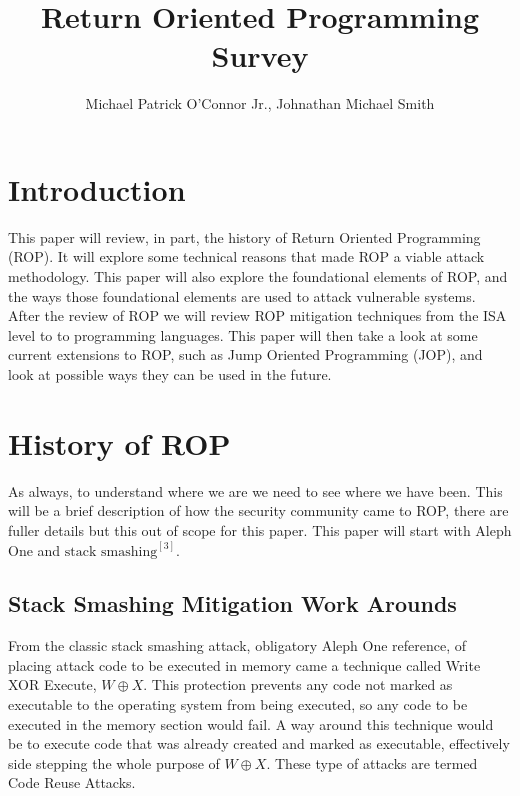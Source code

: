 \documentclass[11pt]{amsart}
\title{Return Oriented Programming Survey}
\author{Michael Patrick O'Connor Jr., Johnathan Michael Smith}
\date{}
\begin{document}
\maketitle

\newpage
\section*{Introduction}
This paper will review, in part, the history of Return Oriented Programming (ROP). It will explore some technical reasons that made ROP a viable attack methodology. This paper will also explore the foundational elements of ROP, and the ways those foundational elements are used to attack vulnerable systems. After the review of ROP we will review ROP mitigation techniques from the ISA level to to programming languages. This paper will then take a look at some current extensions to ROP, such as Jump Oriented Programming (JOP), and look at possible ways they can be used in the future.
\section*{History of ROP}
As always, to understand where we are we need to see where we have been.  This will be a brief description of how the security community came to ROP, there are fuller details but this out of scope for this paper.  This paper will start with Aleph One and $\text{stack smashing}^{[3]}$.
\subsection*{Stack Smashing Mitigation Work Arounds}
From the classic stack smashing attack, obligatory Aleph One reference, of placing attack code to be executed in memory came a technique called Write XOR Execute, $W \oplus X$. This protection prevents any code not marked as executable to the operating system from being executed, so any code to be executed in the memory section would fail. A way around this technique would be to execute code that was already created and marked as executable, effectively side stepping the whole purpose of $W \oplus X$.  These type of attacks are termed Code Reuse Attacks.
\end{document}
